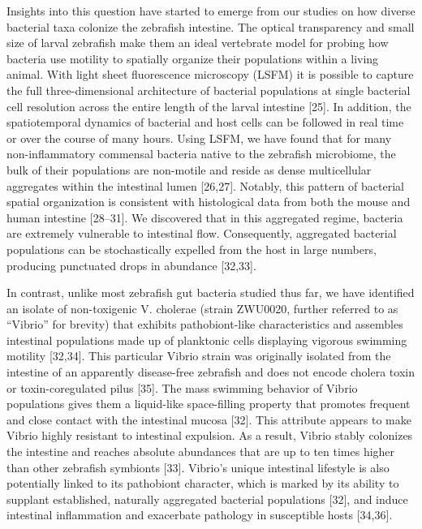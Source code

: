 Insights into this question have started to emerge from our studies on how diverse bacterial taxa colonize the zebrafish intestine. The optical transparency and small size of larval zebrafish make them an ideal vertebrate model for probing how bacteria use motility to spatially organize their populations within a living animal. With light sheet fluorescence microscopy (LSFM) it is possible to capture the full three-dimensional architecture of bacterial populations at single bacterial cell resolution across the entire length of the larval intestine [25]. In addition, the spatiotemporal dynamics of bacterial and host cells can be followed in real time or over the course of many hours. Using LSFM, we have found that for many non-inflammatory commensal bacteria native to the zebrafish microbiome, the bulk of their populations are non-motile and reside as dense multicellular aggregates within the intestinal lumen [26,27]. Notably, this pattern of bacterial spatial organization is consistent with histological data from both the mouse and human intestine [28–31]. We discovered that in this aggregated regime, bacteria are extremely vulnerable to intestinal flow. Consequently, aggregated bacterial populations can be stochastically expelled from the host in large numbers, producing punctuated drops in abundance [32,33]. 

In contrast, unlike most zebrafish gut bacteria studied thus far, we have identified an isolate of non-toxigenic V. cholerae (strain ZWU0020, further referred to as ``Vibrio'' for brevity) that exhibits pathobiont-like characteristics and assembles intestinal populations made up of planktonic cells displaying vigorous swimming motility [32,34]. This particular Vibrio strain was originally isolated from the intestine of an apparently disease-free zebrafish and does not encode cholera toxin or toxin-coregulated pilus [35]. The mass swimming behavior of Vibrio populations gives them a liquid-like space-filling property that promotes frequent and close contact with the intestinal mucosa [32]. This attribute appears to make Vibrio highly resistant to intestinal expulsion. As a result, Vibrio stably colonizes the intestine and reaches absolute abundances that are up to ten times higher than other zebrafish symbionts [33]. Vibrio's unique intestinal lifestyle is also potentially linked to its pathobiont character, which is marked by its ability to supplant established, naturally aggregated bacterial populations [32], and induce intestinal inflammation and exacerbate pathology in susceptible hosts [34,36]. 


